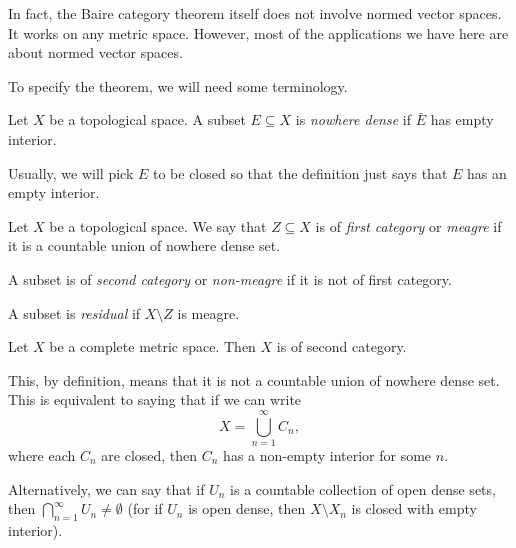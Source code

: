 \documentclass[a4paper]{article}
\begin{document}
In fact, the Baire category theorem itself does not involve normed vector spaces. It works on any metric space. However, most of the applications we have here are about normed vector spaces.

To specify the theorem, we will need some terminology.

\begin{defi}
  Let $X$ be a topological space. A subset $E\subseteq X$ is \emph{nowhere dense} if $\bar{E}$ has empty interior.
\end{defi}
Usually, we will pick $E$ to be closed so that the definition just says that $E$ has an empty interior.

\begin{defi}
  Let $X$ be a topological space. We say that $Z\subseteq X$ is of \emph{first category} or \emph{meagre} if it is a countable union of nowhere dense set.

  A subset is of \emph{second category} or \emph{non-meagre} if it is not of first category.

  A subset is \emph{residual} if $X\setminus Z$ is meagre.
\end{defi}

\begin{thm}
  Let $X$ be a complete metric space. Then $X$ is of second category.
\end{thm}
This, by definition, means that it is not a countable union of nowhere dense set. This is equivalent to saying that if we can write
\[
  X = \bigcup_{n = 1}^\infty C_n,
\]
where each $C_n$ are closed, then $C_n$ has a non-empty interior for some $n$.

Alternatively, we can say that if $U_n$ is a countable collection of open dense sets, then $\bigcap_{n = 1}^\infty U_n \not= \emptyset$ (for if $U_n$ is open dense, then $X\setminus X_n$ is closed with empty interior).
\end{document}
